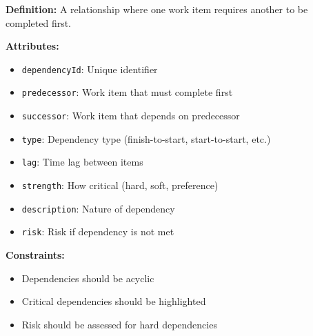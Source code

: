 \documentclass[11pt,letterpaper]{article}
\begin{document}
\begin{definitionbox}
\textbf{Definition:} A relationship where one work item requires another to be completed first.

\textbf{Attributes:}
\begin{itemize}[nosep]
    \item \texttt{dependencyId}: Unique identifier
    \item \texttt{predecessor}: Work item that must complete first
    \item \texttt{successor}: Work item that depends on predecessor
    \item \texttt{type}: Dependency type (finish-to-start, start-to-start, etc.)
    \item \texttt{lag}: Time lag between items
    \item \texttt{strength}: How critical (hard, soft, preference)
    \item \texttt{description}: Nature of dependency
    \item \texttt{risk}: Risk if dependency is not met
\end{itemize}

\textbf{Constraints:}
\begin{itemize}[nosep]
    \item Dependencies should be acyclic
    \item Critical dependencies should be highlighted
    \item Risk should be assessed for hard dependencies
\end{itemize}
\end{definitionbox}
\end{document}

